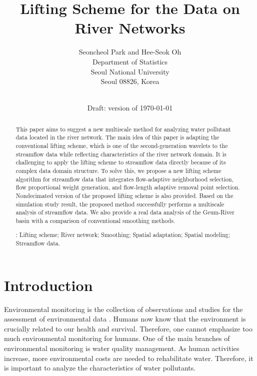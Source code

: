 \documentclass[11pt,titlepage]{article}
\title{\bf Lifting Scheme for the Data on River Networks
\medskip
}
\author{
Seoncheol Park and Hee-Seok Oh \\
Department of Statistics\\
Seoul National University\\
Seoul 08826, Korea\\
\\
}
\date{Draft: version of \today}
\begin{document}
\maketitle


\begin{abstract}
This paper aims to suggest a new multiscale method for analyzing water pollutant data located in the river network. The main idea of this paper is adapting the conventional lifting scheme, which is one of the second-generation wavelets to the streamflow data while reflecting characteristics of the river network domain. It is challenging to apply the lifting scheme to streamflow data directly because of its complex data domain structure. To solve this, we propose a new lifting scheme algorithm for streamflow data that integrates flow-adaptive neighborhood selection, flow proportional weight generation, and flow-length adaptive removal point selection. Nondecimated version of the proposed lifting scheme is also provided. Based on the simulation study result, the proposed method successfully performs a multiscale analysis of streamflow data. 
We also provide a real data analysis of the Geum-River basin with a comparison of conventional smoothing methods.


\vskip 7mm

: Lifting scheme; River network; Smoothing; Spatial adaptation; Spatial modeling; Streamflow data. 

\end{abstract}

\section{Introduction}\label{sec:intro}

Environmental monitoring is the collection of observations and studies for the assessment of environmental data \citep{Artiola2004}. Humans now know that the environment is crucially related to our health and survival. Therefore, one cannot emphasize too much environmental monitoring for humans.
One of the main branches of environmental monitoring is water quality management. As human activities increase, more environmental costs are needed to rehabilitate water. Therefore, it is important to analyze the characteristics of water pollutants. %
\end{document}
